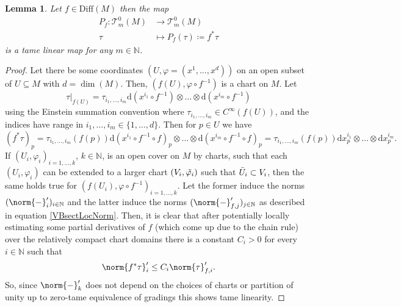 \documentclass[12pt,a4paper]{article}
\theoremstyle{plain}
\newtheorem{lemma}[theorem]{Lemma}
\theoremstyle{definition}
\newcommand{\N}{\mathbb{N}}
\newcommand{\nnorm}[2]{\norm{#1}_{#2}}
\newcommand{\tens}{\otimes}
\newcommand{\Diff}{\mathrm{Diff}(M)}
\newcommand{\tensf}[2]{\mathcal{T}^{#1}_{#2}(M)}
\renewcommand{\d}{\mathrm{d}}
\begin{document}
\begin{lemma}
\label{PullbackFixed_f}
Let $f\in \Diff$ then the map
\begin{align*}
    P_f:\tensf{0}{m}&\longrightarrow \tensf{0}{m}\\
    \tau &\longmapsto P_f(\tau)\coloneqq f^*\tau
\end{align*}
is a tame linear map for any $m\in \N$.
\end{lemma}
\begin{proof}
Let there be some coordinates $(U,\varphi=(x^1,\ldots,x^d))$ on an open subset of $U\subseteq M$ with $d=\dim(M)$. Then, $(f(U),\varphi \circ f^{-1})$ is a chart on $M$. Let $$\left.\tau\right|_{f(U)}=\tau_{i_1,\ldots,i_m}\d(x^{i_1}\circ f^{-1})\tens \ldots\tens \d(x^{i_m}\circ f^{-1})$$
using the Einstein summation convention where $\tau_{i_1,\ldots,i_m}\in C^\infty(f(U))$, and the indices have range in $i_1,\ldots,i_m\in \{1,\ldots,d\}$.  Then for $p\in U$ we have $$(f^*\tau)_p=\tau_{i_1,\ldots,i_m}(f(p))\d(x^{i_1}\circ f^{-1}\circ f)_p\tens \ldots\tens \d(x^{i_m}\circ f^{-1}\circ f)_p=\tau_{i_1,\ldots,i_m}(f(p))\d x^{i_1}_p\tens\ldots\tens \d x^{i_m}_p.$$
If $(U_i,\varphi_i)_{i=1,\ldots,k}$, $k\in \N$, is an open cover on $M$ by charts, such that each $(U_i,\varphi_i)$ can be extended to a larger chart $(V_i,\Tilde{\varphi_i})$ such that $\Bar{U}_i\subset V_i$, then the same holds true for $(f(U_i),\varphi\circ f^{-1})_{i=1,\ldots,k}$. Let the former induce the norms $(\nnorm{-}{i}')_{i\in \N}$ and the latter induce the norms $(\nnorm{-}{f,j}')_{j\in \N}$ as described in equation \eqref{VBsectLocNorm}. Then, it is clear that after potentially locally estimating some partial derivatives of $f$ (which come up due to the chain rule) over the relatively compact chart domains there is a constant $C_i>0$ for every $i\in \N$ such that 
\begin{align*}
    \nnorm{f^*\tau}{i}'\leq C_i\nnorm{\tau}{f,i}'.
\end{align*}
So, since $\nnorm{-}{k}'$ does not depend on the choices of charts or partition of unity up to zero-tame equivalence of gradings this shows tame linearity.
\end{proof}
\end{document}
